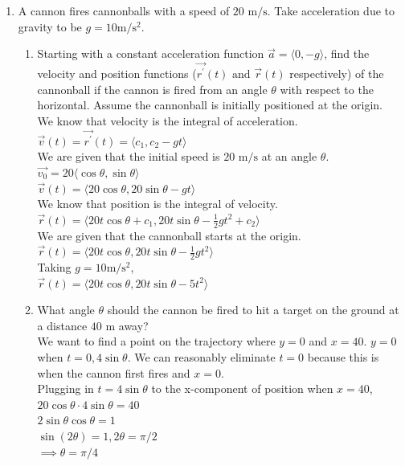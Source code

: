 \begin{enumerate}
	\item A cannon fires cannonballs with a speed of $20 \text{ m} / \text{s}$. Take acceleration due to gravity to be $g = 10 \text{m} / \text{s}^2$.
	\begin{enumerate}[label=\alph*.]
		\item Starting with a constant acceleration function $\vec{a} = \langle 0, -g \rangle$, find the velocity and position functions ($\vec{r^\prime}(t) \text{ and } \vec{r}(t)$ respectively) of the cannonball if the cannon is fired from an angle $\theta$ with respect to the horizontal. Assume the cannonball is initially positioned at the origin.\\
		\indent
		We know that velocity is the integral of acceleration.\\
		$\vec{v}(t) = \vec{r^\prime}(t) = \langle c_1, c_2-gt \rangle$\\
		We are given that the initial speed is $20 \text{ m} / \text{s}$ at an angle $\theta$.\\
		$\vec{v_0} = 20\langle \cos{\theta}, \sin{\theta} \rangle$\\
		$\vec{v}(t) = \langle 20\cos{\theta}, 20\sin{\theta}-gt \rangle$\\
		We know that position is the integral of velocity.\\
		$\vec{r}(t) = \langle 20t\cos{\theta} + c_1, 20t\sin{\theta} - \frac{1}{2}gt^2 + c_2 \rangle$\\
		We are given that the cannonball starts at the origin.\\
		$\vec{r}(t) = \langle 20t\cos{\theta}, 20t\sin{\theta} - \frac{1}{2}gt^2 \rangle$\\
		Taking $g = 10 \text{m} / \text{s}^2$,\\
		$\vec{r}(t) = \langle 20t\cos{\theta}, 20t\sin{\theta}-5t^2 \rangle$\\
			
		\item What angle $\theta$ should the cannon be fired to hit a target on the ground at a distance $40\text{ m}$ away?\\
		\indent
		We want to find a point on the trajectory where $y = 0$ and $x = 40$.
		$y = 0$ when $t = 0, 4\sin{\theta}$. We can reasonably eliminate $t = 0$ because this is when the cannon first fires and $x = 0$.\\
		Plugging in $t = 4\sin{\theta}$ to the x-component of position when $x = 40$,\\
		$20\cos{\theta} \cdot 4\sin{\theta} = 40$\\
		$2\sin{\theta}\cos{\theta} = 1$\\
		$\sin{(2\theta)}=1, 2\theta = \pi/2$\\
		$\implies \theta = \pi/4$\\
	\end{enumerate}
	

\end{enumerate}

